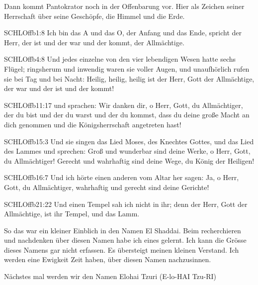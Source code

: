 \begin{otsblock}[Gottesnamen]
    Dann kommt Pantokrator noch in der Offenbarung vor. Hier als Zeichen seiner Herrschaft über seine Geschöpfe, die Himmel und die Erde.
    \begin{bibelbox}{SCHL}{Offb}{1:8}
        Ich bin das A und das O, der Anfang und das Ende, spricht der Herr, der ist und der war und der kommt, der Allmächtige.
    \end{bibelbox}
    \begin{bibelbox}{SCHL}{Offb}{4:8}
        Und jedes einzelne von den vier lebendigen Wesen hatte sechs Flügel; ringsherum und inwendig waren sie voller Augen, und unaufhörlich rufen sie bei Tag und bei Nacht: Heilig, heilig, heilig ist der Herr, Gott der Allmächtige, der war und der ist und der kommt!
    \end{bibelbox}
    \begin{bibelbox}{SCHL}{Offb}{11:17}
        und sprachen: Wir danken dir, o Herr, Gott, du Allmächtiger, der du bist und der du warst und der du kommst, dass du deine große Macht an dich genommen und die Königsherrschaft angetreten hast!
    \end{bibelbox}
    \begin{bibelbox}{SCHL}{Offb}{15:3}
        Und sie singen das Lied Moses, des Knechtes Gottes, und das Lied des Lammes und sprechen: Groß und wunderbar sind deine Werke, o Herr, Gott, du Allmächtiger! Gerecht und wahrhaftig sind deine Wege, du König der Heiligen!
    \end{bibelbox}
    \begin{bibelbox}{SCHL}{Offb}{16:7}
        Und ich hörte einen anderen vom Altar her sagen: Ja, o Herr, Gott, du Allmächtiger, wahrhaftig und gerecht sind deine Gerichte!
    \end{bibelbox}
    \begin{bibelbox}{SCHL}{Offb}{21:22}
        Und einen Tempel sah ich nicht in ihr; denn der Herr, Gott der Allmächtige, ist ihr Tempel, und das Lamm.
    \end{bibelbox}    
    So das war ein kleiner Einblich in den Namen El Shaddai. Beim recherchieren und nachdenken über diesen Namen habe ich eines gelernt. Ich kann die Grösse dieses Namens gar nicht erfassen. Es übersteigt meinen kleinen Verstand. Ich werden eine Ewigkeit Zeit haben, über diesen Namen nachzusinnen.

    Nächstes mal werden wir den Namen Elohai Tzuri (E-lo-HAI Tzu-RI)
    
\end{otsblock}